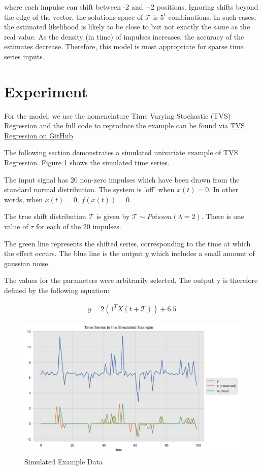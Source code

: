 \documentclass[11pt]{amsart}
\begin{document}
where each impulse can shift between -2 and +2 positions. Ignoring shifts beyond the edge of the vector, the solutions space of $\mathcal{T}$ is $5^t$ combinations.  
In such cases, the estimated likelihood is likely to be close to but not exactly the same as the real value. As the density (in time) of impulses increases, the accuracy of the estimates decrease. Therefore, this model is most appropriate for sparse time series inputs.

\section{Experiment}

For the model, we use the nomenclature Time Varying Stochastic (TVS) Regression and the full code to reproduce the example can be found via \href{https://github.com/aaron1rcl/tvs_regression/}{TVS Regression on GitHub}.

The following section demonstrates a simulated univariate example of TVS Regression. Figure \ref{fig:simulated_example} shows the simulated time series.

The input signal has 20 non-zero impulses which have been drawn from the standard normal distribution. The system is 'off' when $x(t) =0$. In other words, when $x(t) = 0$, $f(x(t)) = 0$. 

The true shift distribution $\mathcal{T}$ is given by $\mathcal{T} \sim Poisson(\lambda = 2)$. There is one value of $\tau$ for each of the 20 impulses.

The green line represents the shifted series, corresponding to the time at which the effect occurs. The blue line is the output $y$ which includes a small amount of gaussian noise.

The values for the parameters were arbitrarily selected. The output y is therefore defined by the following equation:


\begin{align}
    y = 2(1^TX(t + \mathcal{T})) + 6.5
\end{align}


\begin{center}
\begin{figure}
\includegraphics[scale=0.5]{images/simulated_example.png}
\caption{Simulated Example Data}
\label{fig:simulated_example}
\end{figure}
\end{center}
\end{document}
